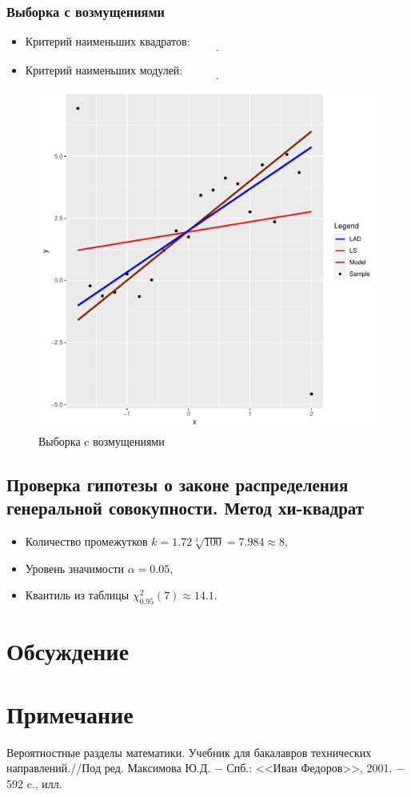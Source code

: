 \documentclass[a4paper]{article}
\begin{document}
\subsubsection{Выборка с возмущениями}
\begin{itemize}
    \item Критерий наименьших квадратов:
    \[
    .
    \]
    \item Критерий наименьших модулей:
    \[
    .
    \]
\end{itemize}
\begin{figure}[H]
    \centering
    \includegraphics[width = 12 cm ]{LabSrcs/resources/perturbated_sample_regression.pdf}
    \caption{Выборка c возмущениями}
    \label{fig:perr}
\end{figure}
\subsection{Проверка гипотезы о законе распределения генеральной совокупности. Метод хи-квадрат}
\begin{itemize}
    \item Количество промежутков $k=1.72\sqrt[3]{100}=7.984\approx8$,
    \item Уровень значимости $\alpha=0.05$,
    \item Квантиль из таблицы $\chi^2_{0.95}(7)\approx 14.1$.
\end{itemize}
\section{Обсуждение}
\section*{Примечание}
\begin{thebibliography}{9}
 Вероятностные разделы математики. Учебник для бакалавров технических направлений.//Под ред. Максимова Ю.Д. $-$ Спб.: <<Иван Федоров>>, 2001. $-$ 592 c., илл.
\end{thebibliography}
\end{document}
